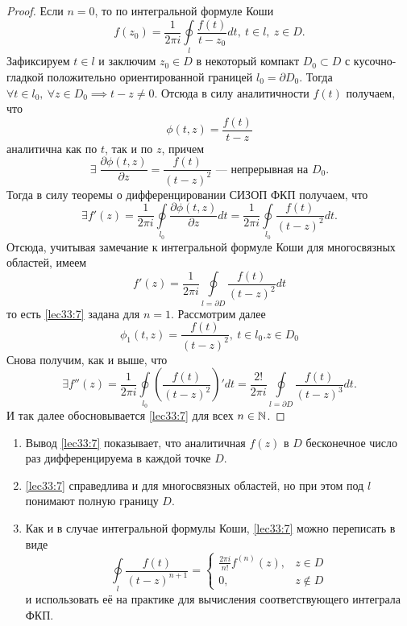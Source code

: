 \documentclass[../../main.tex]{subfiles}
\begin{document}
\begin{proof}
	Если $n=0$, то по интегральной формуле Коши
	\[
	f(z_0) = \frac{1}{2\pi i} \oint \limits_l
	\frac{f(t)}{t-z_0} dt,\ t \in l,\ z \in D.
	\]
	Зафиксируем $t \in l$ и заключим $z_0 \in D$ в
	некоторый компакт $D_0 \subset D$ с 
	кусочно-гладкой положительно ориентированной границей $l_0 = \partial D_0$. 
	Тогда
	$
	\forall t \in l_0,\ 
	\forall z \in D_0
	\implies t - z \neq 0.$
	Отсюда в силу аналитичности $f(t)$ получаем, что
	\begin{equation}
	\label{lec33:9}
	\phi(t, z) = \frac{f(t)}{t-z} 
	\end{equation}
	аналитична как по $t$, так и по $z$, причем
	\[
	\exists\; \frac{\partial \phi(t, z)}{\partial z}
	= \frac{f(t)}{(t-z)^2}
	\text{~--- непрерывная на } D_0.
	\]
	Тогда в силу теоремы о дифференцировании СИЗОП ФКП
	получаем, что 
	\begin{equation}
	\label{lec33:10}
	\exists f'(z) = \frac{1}{2\pi i} \oint\limits_{l_0}
	\frac{\partial \phi(t, z)}{\partial z} dt = 
	\frac{1}{2\pi i} \oint\limits_{l_0}\frac{f(t)}{(t-z)^2} 
	dt.
	\end{equation}
	Отсюда, учитывая замечание к интегральной формуле Коши 
	для многосвязных областей, имеем 
	\[
	f'(z) = \frac{1}{2\pi i} \oint\limits_{l = \partial D} \frac{f(t)}{(t-z)^2} 
	dt
	\]
	то есть \eqref{lec33:7} задана для $n = 1$.
	Рассмотрим далее 
	\[
	\phi_1(t, z) = \frac{f(t)}{(t-z)^2},\ t \in l_0.
	z \in D_0
	\]
	Снова получим, как и выше, что 
	\[
	\exists f''(z) = \frac{1}{2\pi i} \oint\limits_{l_0}
	\left( \frac{f(t)}{(t-z)^2} \right)' dt =
	\frac{2!}{2\pi i} \oint\limits_{l = \partial D}
	\frac{f(t)}{(t-z)^3} dt.
	\]
	И так далее обосновывается \eqref{lec33:7} для всех $n \in \mathbb{N}$.
\end{proof}
\begin{rems}

\;

\begin{enumerate}
	\item Вывод \eqref{lec33:7} показывает, что аналитичная $f(z)$ в 
	$D$ бесконечное число раз дифференцируема в каждой точке
	$D$.
	\item \eqref{lec33:7} справедлива и для многосвязных
	областей, но при этом под $l$ понимают полную границу $D$.
	
	\item Как и в случае интегральной формулы Коши, 
	\eqref{lec33:7} можно переписать в виде 
	\[
	\oint\limits_l \frac{f(t)}{(t-z)^{n+1}} = 
	\begin{cases}
	\frac{2\pi i}{n!} f^{(n)}(z),& z \in D \\
	0,& z \notin D
	\end{cases}
	\]
	и использовать её на практике для вычисления
	соответствующего интеграла ФКП.
\end{enumerate}

\end{rems}
\end{document}
